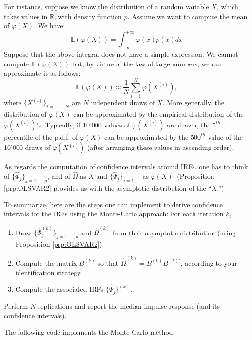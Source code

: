 \documentclass[
  11pt,
]{book}
\providecommand{\tightlist}{%
  \setlength{\itemsep}{0pt}\setlength{\parskip}{0pt}}
\theoremstyle{definition}
\theoremstyle{definition}
\theoremstyle{definition}
\theoremstyle{definition}
\theoremstyle{remark}
\begin{document}
For instance, suppose we know the distribution of a random variable \(X\), which takes values in \(\mathbb{R}\), with density function \(p\). Assume we want to compute the mean of \(\varphi(X)\). We have:
\[
\mathbb{E}(\varphi(X))=\int_{-\infty}^{+\infty}\varphi(x)p(x)dx
\]
Suppose that the above integral does not have a simple expression. We cannot compute \(\mathbb{E}(\varphi(X))\) but, by virtue of the law of large numbers, we can approximate it as follows:
\[
\mathbb{E}(\varphi(X))\approx\frac{1}{N}\sum_{i=1}^N\varphi(X^{(i)}),
\]
where \(\{X^{(i)}\}_{i=1,...,N}\) are \(N\) independent draws of \(X\). More generally, the distribution of \(\varphi(X)\) can be approximated by the empirical distribution of the \(\varphi(X^{(i)})\)'s. Typically, if 10'000 values of \(\varphi(X^{(i)})\) are drawn, the \(5^{th}\) percentile of the p.d.f. of \(\varphi(X)\) can be approximated by the \(500^{th}\) value of the 10'000 draws of \(\varphi(X^{(i)})\) (after arranging these values in ascending order).

As regards the computation of confidence intervals around IRFs, one has to think of \(\{\widehat{\Phi}_j\}_{j=1,...,p}\), and of \(\widehat{\Omega}\) as \(X\) and \(\{\widehat{\Psi}_j\}_{j=1,...}\) as \(\varphi(X)\). (Proposition \ref{prp:OLSVAR2} provides us with the asymptotic distribution of the ``\(X\).'')

To summarize, here are the steps one can implement to derive confidence intervals for the IRFs using the Monte-Carlo approach: For each iteration \(k\),

\begin{enumerate}
\def\labelenumi{\arabic{enumi}.}
\tightlist
\item
  Draw \(\{\widehat{\Phi}_j^{(k)}\}_{j=1,...,p}\) and \(\widehat{\Omega}^{(k)}\) from their asymptotic distribution (using Proposition \ref{prp:OLSVAR2}).
\item
  Compute the matrix \(B^{(k)}\) so that \(\widehat{\Omega}^{(k)}=B^{(k)}B^{(k)'}\), according to your identification strategy.
\item
  Compute the associated IRFs \(\{\widehat{\Psi}_j\}^{(k)}\).
\end{enumerate}

Perform \(N\) replications and report the median impulse response (and its confidence intervals).

The following code implements the Monte Carlo method.
\end{document}
